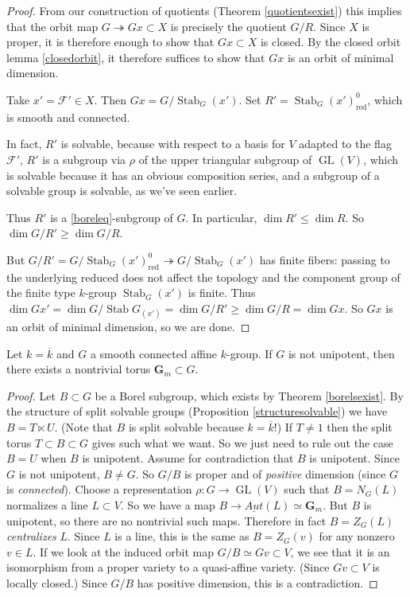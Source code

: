 \documentclass[10pt]{article}
\renewcommand{\(}{\left(}
\renewcommand{\)}{\right)}
\numberwithin{thm}{subsection}
\begin{document}
\begin{proof}
From our construction of quotients (Theorem \ref{quotientsexist})
this implies that the orbit map $G\twoheadrightarrow Gx\subset X$
is precisely the quotient $G/R$.
Since $X$ is proper, it is therefore enough to show that $Gx\subset X$ is closed.
By the closed orbit lemma \ref{closedorbit},  it
therefore suffices to show that $Gx$ is an orbit of minimal dimension.

Take $x'= \mathcal{F}'\in X$.
Then $Gx=G/\operatorname{Stab}_G(x')$.
Set $R'=\operatorname{Stab}_G(x')^0_\mathrm{red}$,
which is smooth and connected.

In fact, $R'$ is solvable, because with respect to a basis for $V$
adapted to the flag $\mathcal{F}'$,
$R'$ is a subgroup via $\rho$
of the upper triangular subgroup of $\operatorname{GL}(V)$,
which is solvable because it has an obvious composition series,
and a subgroup of a solvable group is solvable, as we've seen earlier.

Thus $R'$ is a \eqref{boreleq}-subgroup of $G$.
In particular, $\dim R'\leq \dim R$.
So $\dim G/R'\geq \dim G/R$.

But $G/R' = G/\operatorname{Stab}_G(x')^0_\mathrm{red}\twoheadrightarrow G/\operatorname{Stab}_G(x')$
has finite fibers: passing to the underlying reduced does not affect the topology
and the component group of the finite type $k$-group $\operatorname{Stab}_G(x')$
is finite. Thus $\dim Gx' = \dim G/\operatorname{Stab}G_(x')
=\dim G/R'\geq \dim G/R = \dim Gx$.
So $Gx$ is an orbit of minimal dimension, so we are done.
\end{proof}
\begin{cor}\label{canfindtori}
Let $k=\overline{k}$ and $G$ a smooth connected affine $k$-group.
If $G$ is not unipotent, then there exists a nontrivial
 torus $\mathbf{G}_m\subset G$.
\end{cor}
\begin{proof}
 Let $B\subset G$ be a Borel subgroup, which exists by Theorem \ref{borelsexist}. By the structure of split solvable groups (Proposition \ref{structuresolvable}) we have $B=T\ltimes U$. (Note that $B$ is split solvable because $k=\overline{k}$!)
If $T\neq 1$ then the split torus $T\subset B\subset G$
gives such what we want.
So we just need to rule out the case $B=U$
when $B$ is unipotent. Assume for contradiction that $B$
is unipotent.
Since $G$ is not unipotent, $B\neq G$.
So $G/B$ is proper and of \textit{positive} dimension (since $G$ is {\em connected}).
Choose a representation $\rho:G\rightarrow\operatorname{GL}(V)$
such that $B=N_G(L)$ normalizes a line $L\subset V$.
So we have a map $B\rightarrow\underline{Aut}(L)\simeq \mathbf{G}_m$.
But $B$ is unipotent, so there are no nontrivial such maps.
Therefore in fact $B=Z_G(L)$ \textit{centralizes} $L$.
Since $L$ is a line, this is the same as $B=Z_G(v)$ for any nonzero
$v\in L$.
If we look at the induced orbit map
$G/B\simeq Gv\subset V$,
we see that it is an isomorphism from a proper
variety to a quasi-affine variety. (Since $Gv\subset V$
is locally closed.) Since $G/B$ has positive dimension,
this is a contradiction.
\end{proof}
\end{document}
